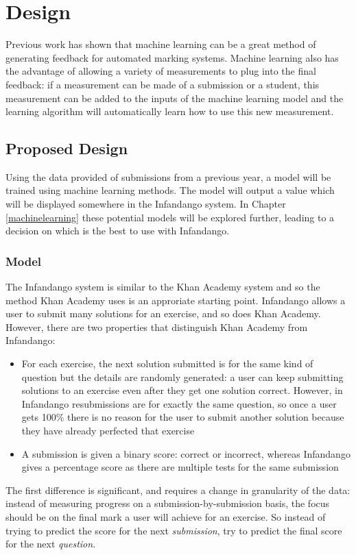 \chapter{Design}
\label{design}
Previous work has shown that machine learning can be a great method of generating feedback for automated marking systems. Machine learning also has the advantage of allowing a variety of measurements to plug into the final feedback: if a measurement can be made of a submission or a student, this measurement can be added to the inputs of the machine learning model and the learning algorithm will automatically learn how to use this new measurement.

\section{Proposed Design}
Using the data provided of submissions from a previous year, a model will be trained using machine learning methods. The model will output a value which will be displayed somewhere in the Infandango system. In Chapter \ref{machinelearning} these potential models will be explored further, leading to a decision on which is the best to use with Infandango.
\subsection{Model}
The Infandango system is similar to the Khan Academy system and so the method Khan Academy uses is an approriate starting point. Infandango allows a user to submit many solutions for an exercise, and so does Khan Academy. However, there are two properties that distinguish Khan Academy from Infandango:

\begin{itemize}
\item For each exercise, the next solution submitted is for the same kind of question but the details are randomly generated: a user can keep submitting solutions to an exercise even after they get one solution correct. However, in Infandango resubmissions are for exactly the same question, so once a user gets 100\% there is no reason for the user to submit another solution because they have already perfected that exercise
\item A submission is given a binary score: correct or incorrect, whereas Infandango gives a percentage score as there are multiple tests for the same submission
\end{itemize}

The first difference is significant, and requires a change in granularity of the data: instead of measuring progress on a submission-by-submission basis, the focus should be on the final mark a user will achieve for an exercise. So instead of trying to predict the score for the next {\it submission}, try to predict the final score for the next {\it question}.

